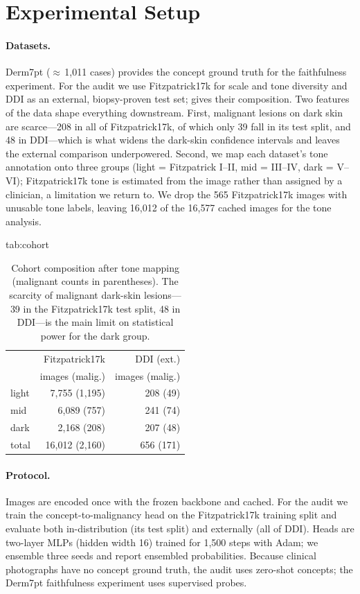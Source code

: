 \documentclass[pmlr,twocolumn,10pt]{jmlr}
\begin{document}
\section{Experimental Setup}
\label{sec:setup}

\paragraph{Datasets.}
Derm7pt \citep{kawahara2019sevenpoint} ($\approx$\,1{,}011 cases) provides the
concept ground truth for the faithfulness experiment. For the audit we use
Fitzpatrick17k \citep{groh2021evaluating} for scale and tone diversity and DDI
\citep{daneshjou2022disparities} as an external, biopsy-proven test set;
 gives their composition. Two features of the data shape
everything downstream. First, malignant lesions on dark skin are scarce---208 in
all of Fitzpatrick17k, of which only 39 fall in its test split, and 48 in
DDI---which is what widens the dark-skin confidence intervals and leaves the
external comparison underpowered. Second, we map each dataset's tone annotation
onto three groups (light = Fitzpatrick I--II, mid = III--IV, dark = V--VI);
Fitzpatrick17k tone is estimated from the image rather than assigned by a
clinician, a limitation we return to. We drop the 565 Fitzpatrick17k images with
unusable tone labels, leaving 16{,}012 of the 16{,}577 cached images for the
tone analysis.

\begin{table}[htbp]
\floatconts
  {tab:cohort}
  {\caption{Cohort composition after tone mapping (malignant counts in
  parentheses). The scarcity of malignant dark-skin lesions---39 in the
  Fitzpatrick17k test split, 48 in DDI---is the main limit on statistical power
  for the dark group.}}
  {\small
  \begin{tabular}{lrr}
  \toprule
   & Fitzpatrick17k & DDI (ext.) \\
   & images (malig.) & images (malig.) \\
  \midrule
  light  & 7{,}755 (1{,}195) & 208 (49) \\
  mid    & 6{,}089 (757)     & 241 (74) \\
  dark   & 2{,}168 (208)     & 207 (48) \\
  \midrule
  total  & 16{,}012 (2{,}160) & 656 (171) \\
  \bottomrule
  \end{tabular}}
\end{table}

\paragraph{Protocol.}
Images are encoded once with the frozen backbone and cached. For the audit we
train the concept-to-malignancy head on the Fitzpatrick17k training split and
evaluate both in-distribution (its test split) and externally (all of DDI).
Heads are two-layer MLPs (hidden width 16) trained for 1{,}500 steps with Adam;
we ensemble three seeds and report ensembled probabilities. Because clinical
photographs have no concept ground truth, the audit uses zero-shot concepts;
the Derm7pt faithfulness experiment uses supervised probes.
\end{document}
